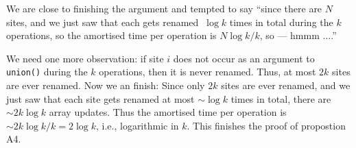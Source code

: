 \documentclass{tufte-handout}
\begin{document}
We are close to finishing the argument and tempted to say ``since
there are $N$ sites, and we just saw that each gets renamed $~\log k$
times in total during the $k$ operations, so the amortised time per
operation is $N\log k / k$, so --- hmmm $\ldots$.''

We need one more observation: if site $i$ does not occur as an
argument to {\tt union()} during the $k$ operations, then it is never
renamed. Thus, at most $2k$ sites are ever renamed. Now we an finish:
Since only $2k$ sites are ever renamed, and we just saw that each site
gets renamed at most $\sim\log k$ times in total, there are $\sim
2k\log k$ array updates. Thus the amortised time per operation is
$\sim 2k\log k / k = 2\log k$, i.e., logarithmic in $k$. This finishes
the proof of propostion A4.
\end{document}
